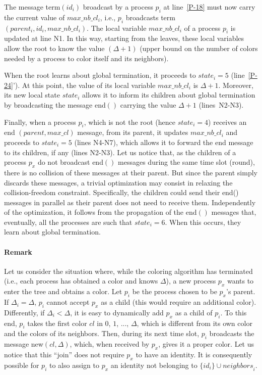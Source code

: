 \documentclass[11pt,english]{article}
\newcommand{\neighbors}{\mathit{neighbors}}
\begin{document}
The message {\sc term}$(id_i)$ broadcast by a process $p_i$ at
line~\ref{P-18} must now carry the current value of $max\_nb\_cl_i$,
i.e., $p_i$ broadcasts {\sc term}$(parent_i,id_i,max\_nb\_cl_i)$.  The local
variable $max\_nb\_cl_i$ of a process $p_i$ is updated at line N1. In this way,
starting from the leaves, these local variables allow the root to know
the value $(\Delta+1)$ (upper bound on the number of colors needed by
a process to color itself and its neighbors).

When the root learns about global termination, it proceeds to
$state_i=5$ (line~\ref{P-24}'). At this point, the value of its local
variable $max\_nb\_cl_i$ is $\Delta+1$. Moreover, its new local state
$state_i$ allows it to inform its children about global termination by
broadcasting the message {\sc end}$()$ carrying the value $\Delta+1$
(lines~N2-N3).

Finally, when a process $p_i$, which is not the root (hence
$state_i=4$) receives an {\sc end} $(parent,max\_cl)$ message, from
its parent, it updates $max\_nb\_cl_i$ and proceeds to $state_i=5$
(lines N4-N7), which allows it to forward the {\sc end} message to its
children, if any (lines N2-N3).  Let us notice that, as the children
of a process $p_x$ do not broadcast {\sc end}$()$ messages during the
same time slot (round), there is no collision of these messages at
their parent. But since the parent simply discards these messages, a
trivial optimization may consist in relaxing the collision-freedom
constraint. Specifically, the children could send their {\sc end}()
messages in parallel as their parent does not need to receive
them. Independently of the optimization, it follows from the
propagation of the {\sc end}$()$ messages that, eventually, all the
processes are such that $state_i=6$. When this occurs, they learn about
global termination.

\paragraph{Remark}
Let us consider the situation where, while the coloring algorithm has 
terminated (i.e., each  process has obtained a color and knows $\Delta$),  
a new process $p_x$ wants to enter the tree and obtains a color. 
Let $p_i$ be the process  chosen to be $p_x$'s parent. 
If $\Delta_i = \Delta$, $p_i$ cannot accept $p_x$ as a child
(this would require an additional color).  Differently, 
if $\Delta_i<\Delta$, it is easy to dynamically add $p_x$ as a child of $p_i$. 
To this end, $p_i$ takes the first color $cl$ in $0$, $1$, ..., $\Delta$, 
which is different from its own color and the colors of its neighbors.  
Then, during its next time slot, $p_i$  broadcasts the  message 
{\sc new}$(cl,\Delta)$, which, when received by $p_x$, gives it a proper 
color. Let us notice that this ``join'' does not require $p_x$ to have an 
identity.  It is consequently possible for $p_i$ to also assign to $p_x$  an 
identity not belonging to $\{id_i\} \cup \neighbors_i$. 
\end{document}
